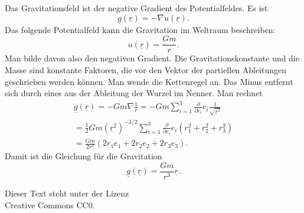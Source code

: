 \documentclass[a4paper,10pt,fleqn,twocolumn,twoside]{scrartcl}
\begin{document}
Das Gravitationsfeld ist der negative Gradient des Potentialfeldes.
Es ist%
\[\underline g(\underline r) = -\nabla u(\underline r).\]
Das folgende Potentialfeld kann die Gravitation im Weltraum
beschreiben:%
\[u(\underline r) = \frac{Gm}{r}.\]
Man bilde davon also den negativen Gradient. Die Gravitationskonstante
und die Masse sind konstante Faktoren, die vor den Vektor der
partiellen Ableitungen geschrieben werden können. Man wende die
Kettenregel an. Das Minus entfernt sich durch eines aus der
Ableitung der Wurzel im Nenner. Man rechnet%
\begin{gather*}
\underline g(\underline r)
= -Gm\nabla\frac{1}{r}
= -Gm\sum_{i=1}^3 \frac{\partial}{\partial r_i}
e_i \frac{1}{\sqrt{\underline r^2}}\\
= \frac{1}{2}Gm (\underline r^2)^{-3/2}
\sum_{i=1}^3 \frac{\partial}{\partial r_i} e_i (r_1^2+r_2^2+r_3^2)\\
= \frac{Gm}{2r^3}(2r_1e_1 + 2r_2e_2 + 2r_3e_3).
\end{gather*}
Damit ist die Gleichung für die Gravitation%
\[\underline g(\underline r) = \frac{Gm}{r^3} \underline r.\]


\vfill\noindent
Dieser Text steht unter der Lizenz\\
Creative Commons CC0.
\end{document}
